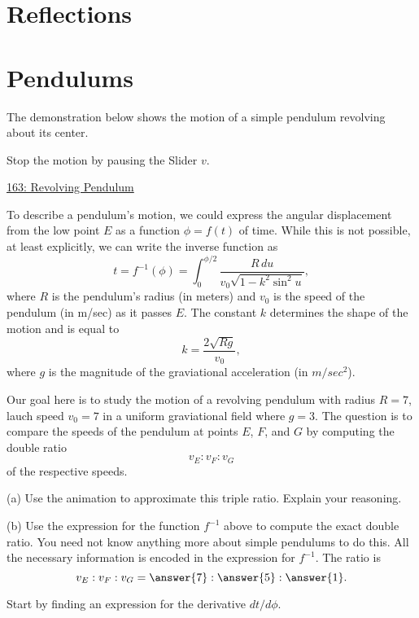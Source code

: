 \documentclass{ximera}
\begin{document}
\section*{Reflections}


\section*{Pendulums}

\begin{question}  \label{QDfdfgrenhht44}
The demonstration below shows the motion of a simple pendulum revolving about its center.

\begin{exploration}
Stop the motion by pausing the Slider $v$. 
\begin{onlineOnly}
    \begin{center}
\end{center}
\end{onlineOnly}

\href{https://www.desmos.com/calculator/nsfqtjr8fd}{163: Revolving Pendulum}
\end{exploration}

To describe a pendulum's motion, we could express the angular displacement from the low point $E$ as a function $\phi = f(t)$ of time. While this is not possible, at least explicitly, we can write the inverse function as
\[
     t = f^{-1}(\phi) = \int_0^{\phi/2} \frac{R\, du}{v_0\sqrt{1-k^2\sin^2u}} ,
\]
where $R$ is the pendulum's radius (in meters) and $v_0$ is the speed of the pendulum (in m/sec) as it passes $E$. The constant $k$ determines the shape of the motion and is equal to
\[
        k = \frac{2\sqrt{Rg}}{v_0} ,
\]
where $g$ is the magnitude of the graviational acceleration (in $m/sec^2$).

Our goal here is to study the motion of a revolving pendulum with radius $R=7$, lauch speed $v_0=7$ in a uniform graviational field where $g=3$. The question is to compare the speeds of the pendulum at points $E$, $F$, and $G$ by computing the double ratio
\[
  v_E : v_F : v_G
\]
of the respective speeds.

\begin{freeResponse}
(a) Use the animation to approximate this triple ratio. Explain your reasoning.
\end{freeResponse}


(b) Use the expression for the function $f^{-1}$ above to compute the exact double ratio. You need not know anything more about simple pendulums to do this. All the necessary information is encoded in the expression for $f^{-1}$. The ratio is
\[
      v_E : v_F : v_G = \answer{7}: \answer{5}:\answer{1} .
\]



\begin{hint}
Start by finding an expression for the derivative $dt/d\phi$.
\end{hint}

\end{question}
\end{document}
